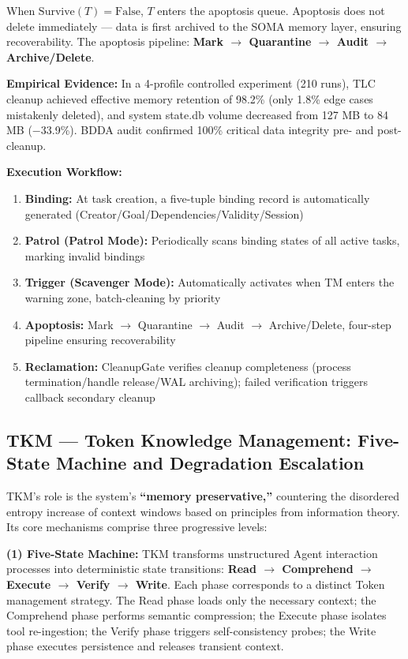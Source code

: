 \documentclass[11pt,a4paper]{article}
\begin{document}
When $\text{Survive}(T) = \text{False}$, $T$ enters the apoptosis queue. Apoptosis does not delete immediately --- data is first archived to the SOMA memory layer, ensuring recoverability. The apoptosis pipeline: \textbf{Mark $\rightarrow$ Quarantine $\rightarrow$ Audit $\rightarrow$ Archive/Delete}.

\textbf{Empirical Evidence:} In a 4-profile controlled experiment (210 runs), TLC cleanup achieved effective memory retention of 98.2\% (only 1.8\% edge cases mistakenly deleted), and system state.db volume decreased from 127 MB to 84 MB ($-$33.9\%). BDDA audit confirmed 100\% critical data integrity pre- and post-cleanup.

\smallskip
\noindent\textbf{Execution Workflow:}
\begin{enumerate}
  \item \textbf{Binding:} At task creation, a five-tuple binding record is automatically generated (Creator/Goal/Dependencies/Validity/Session)
  \item \textbf{Patrol (Patrol Mode):} Periodically scans binding states of all active tasks, marking invalid bindings
  \item \textbf{Trigger (Scavenger Mode):} Automatically activates when TM enters the warning zone, batch-cleaning by priority
  \item \textbf{Apoptosis:} Mark $\rightarrow$ Quarantine $\rightarrow$ Audit $\rightarrow$ Archive/Delete, four-step pipeline ensuring recoverability
  \item \textbf{Reclamation:} CleanupGate verifies cleanup completeness (process termination/handle release/WAL archiving); failed verification triggers callback secondary cleanup
\end{enumerate}

\subsection{TKM --- Token Knowledge Management: Five-State Machine and Degradation Escalation}

TKM's role is the system's \textbf{``memory preservative,'' } countering the disordered entropy increase of context windows based on principles from information theory. Its core mechanisms comprise three progressive levels:

\smallskip
\noindent\textbf{(1) Five-State Machine:} TKM transforms unstructured Agent interaction processes into deterministic state transitions: \textbf{Read $\rightarrow$ Comprehend $\rightarrow$ Execute $\rightarrow$ Verify $\rightarrow$ Write}. Each phase corresponds to a distinct Token management strategy. The Read phase loads only the necessary context; the Comprehend phase performs semantic compression; the Execute phase isolates tool re-ingestion; the Verify phase triggers self-consistency probes; the Write phase executes persistence and releases transient context.
\end{document}
